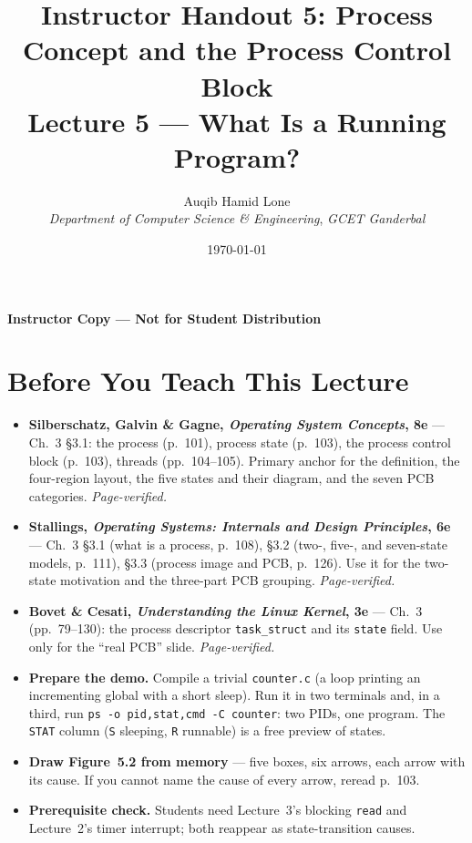 \documentclass[11pt]{article}
\title{Instructor Handout 5: Process Concept and the Process Control Block\\[0.3em]
  \large Lecture 5 --- What Is a Running Program?}
\author{Auqib Hamid Lone\\[0.3em]
  \emph{Department of Computer Science \& Engineering}, \emph{GCET Ganderbal}}
\date{\today}
\begin{document}
\maketitle
{\centering\large\color{negative}\textbf{Instructor Copy --- Not for Student Distribution}\par}
\vspace{0.5cm}

\section{Before You Teach This Lecture}

\begin{itemize}
  \item \textbf{Silberschatz, Galvin \& Gagne, \textit{Operating System Concepts}, 8e} --- Ch.~3 \S3.1: the process (p.~101), process state (p.~103), the process control block (p.~103), threads (pp.~104--105). Primary anchor for the definition, the four-region layout, the five states and their diagram, and the seven PCB categories. \emph{Page-verified.}
  \item \textbf{Stallings, \textit{Operating Systems: Internals and Design Principles}, 6e} --- Ch.~3 \S3.1 (what is a process, p.~108), \S3.2 (two-, five-, and seven-state models, p.~111), \S3.3 (process image and PCB, p.~126). Use it for the two-state motivation and the three-part PCB grouping. \emph{Page-verified.}
  \item \textbf{Bovet \& Cesati, \textit{Understanding the Linux Kernel}, 3e} --- Ch.~3 (pp.~79--130): the process descriptor \texttt{task\_struct} and its \texttt{state} field. Use only for the ``real PCB'' slide. \emph{Page-verified.}
  \item \textbf{Prepare the demo.} Compile a trivial \texttt{counter.c} (a loop printing an incrementing global with a short sleep). Run it in two terminals and, in a third, run \texttt{ps -o pid,stat,cmd -C counter}: two PIDs, one program. The \texttt{STAT} column (\texttt{S} sleeping, \texttt{R} runnable) is a free preview of states.
  \item \textbf{Draw Figure~5.2 from memory} --- five boxes, six arrows, each arrow with its cause. If you cannot name the cause of every arrow, reread p.~103.
  \item \textbf{Prerequisite check.} Students need Lecture~3's blocking \texttt{read} and Lecture~2's timer interrupt; both reappear as state-transition causes.
\end{itemize}
\end{document}
